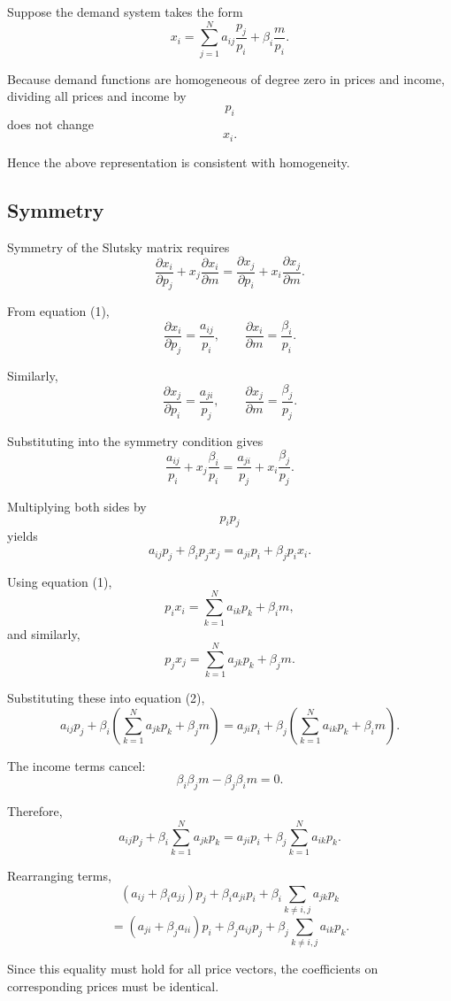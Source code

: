 Suppose the demand system takes the form
\[
x_i
=
\sum_{j=1}^N
a_{ij}\frac{p_j}{p_i}
+
\beta_i\frac{m}{p_i}.
\tag{1}
\]

Because demand functions are homogeneous of degree zero in prices and income,
dividing all prices and income by
\[
p_i
\]
does not change
\[
x_i.
\]

Hence the above representation is consistent with homogeneity.

\subsection{Symmetry}

Symmetry of the Slutsky matrix requires
\[
\frac{\partial x_i}{\partial p_j}
+
x_j\frac{\partial x_i}{\partial m}
=
\frac{\partial x_j}{\partial p_i}
+
x_i\frac{\partial x_j}{\partial m}.
\]

From equation (1),
\[
\frac{\partial x_i}{\partial p_j}
=
\frac{a_{ij}}{p_i},
\qquad
\frac{\partial x_i}{\partial m}
=
\frac{\beta_i}{p_i}.
\]

Similarly,
\[
\frac{\partial x_j}{\partial p_i}
=
\frac{a_{ji}}{p_j},
\qquad
\frac{\partial x_j}{\partial m}
=
\frac{\beta_j}{p_j}.
\]

Substituting into the symmetry condition gives
\[
\frac{a_{ij}}{p_i}
+
x_j\frac{\beta_i}{p_i}
=
\frac{a_{ji}}{p_j}
+
x_i\frac{\beta_j}{p_j}.
\]

Multiplying both sides by
\[
p_ip_j
\]
yields
\[
a_{ij}p_j+\beta_ip_jx_j
=
a_{ji}p_i+\beta_jp_ix_i.
\tag{2}
\]

Using equation (1),
\[
p_ix_i
=
\sum_{k=1}^N a_{ik}p_k+\beta_im,
\]
and similarly,
\[
p_jx_j
=
\sum_{k=1}^N a_{jk}p_k+\beta_jm.
\]

Substituting these into equation (2),
\[
a_{ij}p_j
+
\beta_i
\left(
\sum_{k=1}^N a_{jk}p_k+\beta_jm
\right)
=
a_{ji}p_i
+
\beta_j
\left(
\sum_{k=1}^N a_{ik}p_k+\beta_im
\right).
\]

The income terms cancel:
\[
\beta_i\beta_jm-\beta_j\beta_im=0.
\]

Therefore,
\[
a_{ij}p_j
+
\beta_i\sum_{k=1}^N a_{jk}p_k
=
a_{ji}p_i
+
\beta_j\sum_{k=1}^N a_{ik}p_k.
\]

Rearranging terms,
\[
(a_{ij}+\beta_ia_{jj})p_j
+
\beta_ia_{ji}p_i
+
\beta_i\sum_{k\ne i,j}a_{jk}p_k
\]
\[
=
(a_{ji}+\beta_ja_{ii})p_i
+
\beta_ja_{ij}p_j
+
\beta_j\sum_{k\ne i,j}a_{ik}p_k.
\]

Since this equality must hold for all price vectors,
the coefficients on corresponding prices must be identical.

